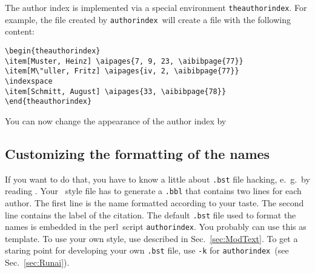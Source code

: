 \documentclass{article}
\newcommand{\aiperl}{\texttt{authorindex}}
\newcommand{\perl}{\textsf{perl}}
\newcommand{\fnext}[1]{\texttt{.#1}}
\newcommand{\option}[1]{\texttt{#1}}
\newcommand{\ltxinp}[1]{\texttt{\string#1}}
\begin{document}
The author index is implemented via a special environment
\ltxinp{theauthorindex}. For example, the file created by \aiperl\ will
create a file with the following content:
\begin{verbatim}
\begin{theauthorindex}
\item[Muster, Heinz] \aipages{7, 9, 23, \aibibpage{77}}
\item[M\"uller, Fritz] \aipages{iv, 2, \aibibpage{77}}
\indexspace
\item[Schmitt, August] \aipages{33, \aibibpage{78}}
\end{theauthorindex}
\end{verbatim}
You can now change the appearance of the author index by


\subsection{Customizing the formatting of the names}
\label{sec:CustNameFormat}

If you want to do that, you have to know a little about \fnext{bst} file
hacking, e.~g.\ by reading \cite{Patashnik88b}. Your \BibTeX\ style file has to
generate a \fnext{bbl} that contains two lines for each author. The first line
is the name formatted according to your taste. The second line contains the
label of the citation. The default \fnext{bst} file used to format the names is
embedded in the \perl\ script \aiperl. You probably can use this as
template. To use your own style, use \ltxinp{\authorindexstyle} described
in Sec.~\ref{sec:ModText}. To get a staring point for developing your own
\fnext{bst} file, use \option{-k} for \aiperl\ (see Sec.~\ref{sec:Runai}).
\end{document}

